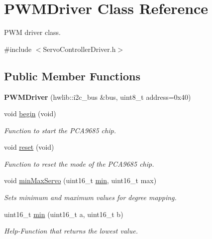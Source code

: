 \hypertarget{classPWMDriver}{}\section{P\+W\+M\+Driver Class Reference}
\label{classPWMDriver}


P\+WM driver class.  




{\ttfamily \#include $<$Servo\+Controller\+Driver.\+h$>$}

\subsection*{Public Member Functions}
\begin{DoxyCompactItemize}
\item 
\mbox{\label{classPWMDriver_a103dca66c9409beb103ffc6a2bc69a74}} 
{\bfseries P\+W\+M\+Driver} (hwlib\+::i2c\+\_\+bus \&bus, uint8\+\_\+t address=0x40)
\item 
void \hyperlink{classPWMDriver_ad04b5d0815c1d37934ea7f94a04cfe37}{begin} (void)
\begin{DoxyCompactList}\small\item\em Function to start the P\+C\+A9685 chip. \end{DoxyCompactList}\item 
void \hyperlink{classPWMDriver_a3df1a36b697cb9297676a30d1ebeecd3}{reset} (void)
\begin{DoxyCompactList}\small\item\em Function to reset the mode of the P\+C\+A9685 chip. \end{DoxyCompactList}\item 
void \hyperlink{classPWMDriver_ae594f58413fa3e879f3038b8aa5c6027}{min\+Max\+Servo} (uint16\+\_\+t \hyperlink{classPWMDriver_aae39ea3ebac1a2b9724b7319b203230e}{min}, uint16\+\_\+t max)
\begin{DoxyCompactList}\small\item\em Sets minimum and maximum values for degree mapping. \end{DoxyCompactList}\item 
uint16\+\_\+t \hyperlink{classPWMDriver_aae39ea3ebac1a2b9724b7319b203230e}{min} (uint16\+\_\+t a, uint16\+\_\+t b)
\begin{DoxyCompactList}\small\item\em Help-\/\+Function that returns the lowest value. \end{DoxyCompactList}\item 

\end{DoxyCompactItemize}
